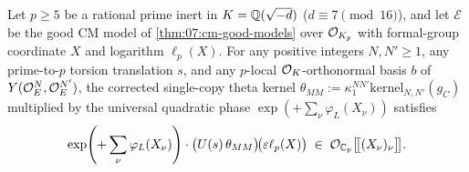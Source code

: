 \begin{theorem}
\label{thm:07:int-inert}
Let $p \ge 5$ be a rational prime inert in $K = \mathbb{Q}(\sqrt{-d})$ ($d \equiv 7 \pmod{16}$), and let $\mathcal{E}$ be the good CM model of \cref{thm:07:cm-good-models} over $\mathcal{O}_{K_p}$ with formal-group coordinate $X$ and logarithm $\ell_p(X)$. For any positive integers $N, N' \ge 1$, any prime-to-$p$ torsion translation $s$, and any $p$-local $\mathcal{O}_K$-orthonormal basis $b$ of $Y(\mathcal{O}_E^N, \mathcal{O}_E^{N'})$, the corrected single-copy theta kernel $\theta_{MM} := \kappa_1^{N N'} \mathrm{kernel}_{N, N'}(g_C)$ multiplied by the universal quadratic phase $\exp(+\sum_{\nu} \varphi_L(X_\nu))$ satisfies
\begin{equation}
\label{eq:07:int-inert}
  \exp\!\left(+\sum_{\nu} \varphi_L(X_\nu)\right) \cdot \bigl(U(s)\,\theta_{MM}\bigr)\!\bigl(\varepsilon \ell_p(X)\bigr)
  \;\in\; \mathcal{O}_{\mathbb{C}_p}\bigl[\!\bigl[(X_\nu)_\nu\bigr]\!\bigr].
\end{equation}
\end{theorem}

